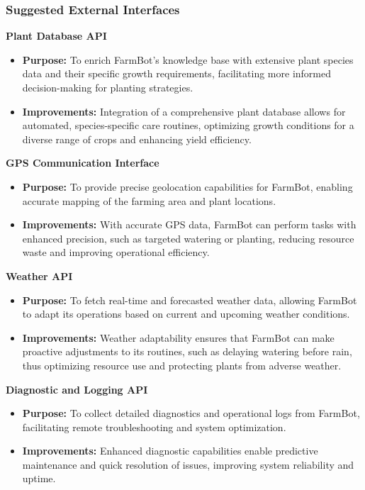\subsubsection{Suggested External Interfaces}

\textbf{Plant Database API}
\begin{itemize}
    \item \textbf{Purpose:} To enrich FarmBot's knowledge base with extensive plant species data and their specific growth requirements, facilitating more informed decision-making for planting strategies.
    \item \textbf{Improvements:} Integration of a comprehensive plant database allows for automated, species-specific care routines, optimizing growth conditions for a diverse range of crops and enhancing yield efficiency.
\end{itemize}

\textbf{GPS Communication Interface}
\begin{itemize}
    \item \textbf{Purpose:} To provide precise geolocation capabilities for FarmBot, enabling accurate mapping of the farming area and plant locations.
    \item \textbf{Improvements:} With accurate GPS data, FarmBot can perform tasks with enhanced precision, such as targeted watering or planting, reducing resource waste and improving operational efficiency.
\end{itemize}

\textbf{Weather API}
\begin{itemize}
    \item \textbf{Purpose:} To fetch real-time and forecasted weather data, allowing FarmBot to adapt its operations based on current and upcoming weather conditions.
    \item \textbf{Improvements:} Weather adaptability ensures that FarmBot can make proactive adjustments to its routines, such as delaying watering before rain, thus optimizing resource use and protecting plants from adverse weather.
\end{itemize}

\textbf{Diagnostic and Logging API}
\begin{itemize}
    \item \textbf{Purpose:} To collect detailed diagnostics and operational logs from FarmBot, facilitating remote troubleshooting and system optimization.
    \item \textbf{Improvements:} Enhanced diagnostic capabilities enable predictive maintenance and quick resolution of issues, improving system reliability and uptime.
\end{itemize}

